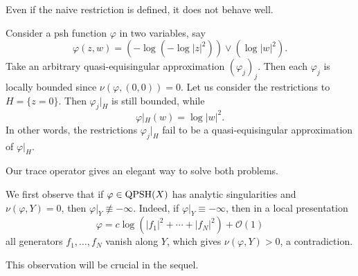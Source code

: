 Even if the naive restriction is defined, it does not behave well.
\begin{example}\label{ex:naive_res2}
    Consider a psh function $\varphi$ in two variables, say
    \[
    \varphi(z,w)=\left( -\log (-\log |z|^2)\right) \lor \left(\log |w|^2\right).
    \]
    Take an arbitrary quasi-equisingular approximation $(\varphi_j)_j$. Then each $\varphi_j$ is locally bounded since $\nu(\varphi,(0,0))=0$. Let us consider the restrictions to $H=\{z=0\}$. Then $\varphi_j|_H$ is still bounded, while
    \[
    \varphi|_H(w)=\log |w|^2.
    \]
    In other words, the restrictions $\varphi_j|_H$ fail to be a quasi-equisingular approximation of $\varphi|_H$.
\end{example}
Our trace operator gives an elegant way to solve both problems.

We first observe that if $\varphi\in \mathrm{QPSH}(X)$ has analytic singularities and $\nu(\varphi,Y)=0$, then $\varphi|_Y\not\equiv -\infty$.
Indeed, if $\varphi|_Y\equiv-\infty$, then in a local presentation
\[
    \varphi=c\log(|f_1|^2+\cdots+|f_N|^2)+\mathcal{O}(1)
\]
all generators $f_1,\ldots,f_N$ vanish along $Y$, which gives $\nu(\varphi,Y)>0$, a contradiction.

This observation will be crucial in the sequel.

